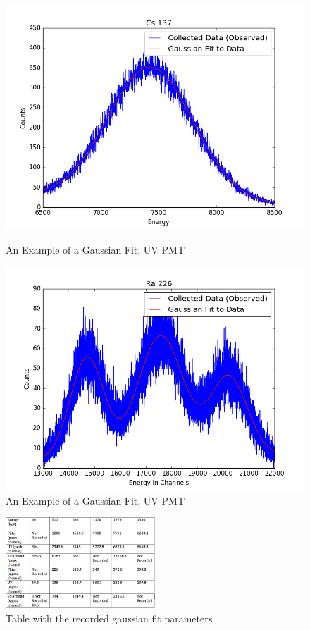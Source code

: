\documentclass{article}
\begin{document}
\begin{figure}[H]
  \centering
  \begin{minipage}[b]{0.4\textwidth}
    \includegraphics[width=\textwidth]{Cs137.png}
    \caption{An Example of a Gaussian Fit, UV PMT}
  \end{minipage}
  \hfill
  \begin{minipage}[b]{0.4\textwidth}
    \includegraphics[width=\textwidth]{Ra1.png}
    \caption{An Example of a Gaussian Fit, UV PMT}
  \end{minipage}
\end{figure}

\begin{figure}
  \centering
    \includegraphics[width=0.5\textwidth]{gaussfits.png}
  \caption{Table with the recorded gaussian fit parameters}
  \label{fig:workflowedge}
\end{figure} 
\end{document}
